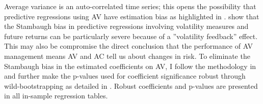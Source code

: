 

Average variance is an auto-correlated time series; this opens the possibility that predictive regressions using AV have estimation bias as highlighted in \citet{stambaugh_predictive_1999}. \citet{campbell_no_1992} show that the Stambaugh bias in predictive regressions involving volatility measures and future returns can be particularly severe because of a ”volatility feedback” effect. This may also be compromise the direct conclusion that the performance of AV management means AV and AC tell us about changes in risk. To eliminate the Stambaugh bias in the estimated coefficients on AV, I follow the methodology in \citet{Amihud2004} and further make the p-values used for coefficient significance robust through wild-bootstrapping as detailed in \citet{mackinnon_bootstrap_2002}. Robust coefficients and p-values are presented in all in-sample regression tables.

